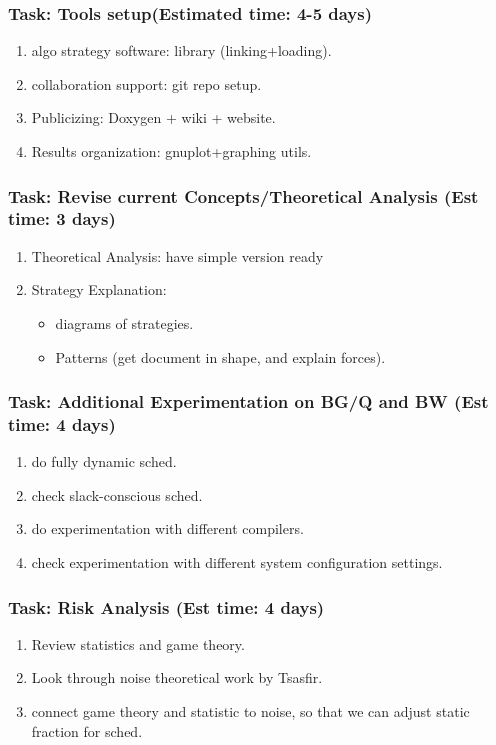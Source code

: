 \begin{frame} [Tasks] 
\frametitle{Task: Tools setup(Estimated time: 4-5 days)}
\begin{enumerate} 
\item algo strategy software: library (linking+loading). \\
\item collaboration support:  git repo setup. \\
\item Publicizing: Doxygen + wiki + website. \\
\item Results organization:  gnuplot+graphing utils. \\
\end{enumerate}
\end{frame}  

\begin{frame} [Tasks] 
\frametitle{Task: Revise current Concepts/Theoretical Analysis (Est time: 3 days) }
\begin{enumerate} 
\item Theoretical Analysis: have simple version ready \\
\item Strategy Explanation: \\
\begin{itemize}
   \item diagrams of strategies. 
   \item  Patterns (get document in shape, and explain forces). 
\end{itemize} 
\end{enumerate}
\end{frame}  

\begin{frame} [Tasks] 
\frametitle{Task: Additional Experimentation on BG/Q and BW (Est time: 4 days)}
\begin{enumerate} 
\item do fully dynamic sched. 
\item check slack-conscious sched. 
\item do experimentation with different compilers. 
\item check experimentation with different system configuration settings. 
\end{enumerate} 
\end{frame}  

\begin{frame} [Tasks] 
\frametitle{Task: Risk Analysis (Est time:  4 days) }
\begin{enumerate} 
\item Review statistics and game theory. 
\item Look through noise theoretical work by Tsasfir.
\item connect game theory and statistic to noise, so that we 
can adjust static fraction for sched. 
\end{enumerate} 
\end{frame} 

